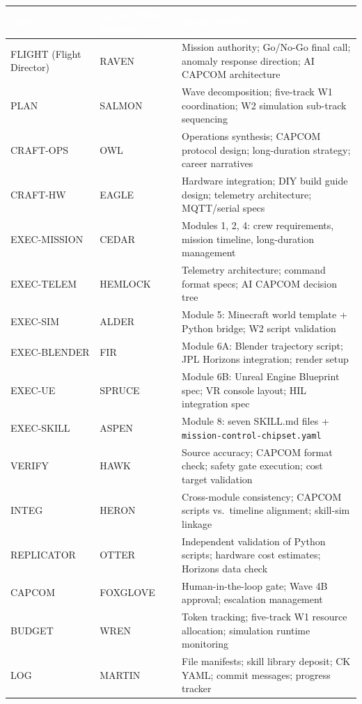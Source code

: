 \documentclass[11pt,letterpaper]{article}
\newcommand{\tableheader}[1]{\textbf{\sffamily\textcolor{white}{#1}}}
\begin{document}
\begin{center}
\begin{tabularx}{\textwidth}{L{2.5cm}L{2.8cm}X}
\toprule
{}
\tableheader{Role} & \tableheader{Agent (PNW Naming)} & \tableheader{Responsibility} \\
\midrule
FLIGHT (Flight Director) & RAVEN & Mission authority; Go/No-Go final call; anomaly response direction; AI CAPCOM architecture \\
PLAN & SALMON & Wave decomposition; five-track W1 coordination; W2 simulation sub-track sequencing \\
CRAFT-OPS & OWL & Operations synthesis; CAPCOM protocol design; long-duration strategy; career narratives \\
CRAFT-HW & EAGLE & Hardware integration; DIY build guide design; telemetry architecture; MQTT/serial specs \\
EXEC-MISSION & CEDAR & Modules 1, 2, 4: crew requirements, mission timeline, long-duration management \\
EXEC-TELEM & HEMLOCK & Telemetry architecture; command format specs; AI CAPCOM decision tree \\
EXEC-SIM & ALDER & Module 5: Minecraft world template + Python bridge; W2 script validation \\
EXEC-BLENDER & FIR & Module 6A: Blender trajectory script; JPL Horizons integration; render setup \\
EXEC-UE & SPRUCE & Module 6B: Unreal Engine Blueprint spec; VR console layout; HIL integration spec \\
EXEC-SKILL & ASPEN & Module 8: seven SKILL.md files + \texttt{mission-control-chipset.yaml} \\
VERIFY & HAWK & Source accuracy; CAPCOM format check; safety gate execution; cost target validation \\
INTEG & HERON & Cross-module consistency; CAPCOM scripts vs.\ timeline alignment; skill-sim linkage \\
REPLICATOR & OTTER & Independent validation of Python scripts; hardware cost estimates; Horizons data check \\
CAPCOM & FOXGLOVE & Human-in-the-loop gate; Wave 4B approval; escalation management \\
BUDGET & WREN & Token tracking; five-track W1 resource allocation; simulation runtime monitoring \\
LOG & MARTIN & File manifests; skill library deposit; CK YAML; commit messages; progress tracker \\

\end{tabularx}
\end{center}
\end{document}
